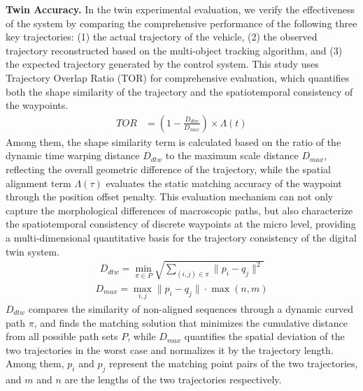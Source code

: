 \documentclass[journal,twoside,web]{ieeecolor}
\begin{document}
\textbf{Twin Accuracy.}
In the twin experimental evaluation, we verify the effectiveness of the system by comparing the comprehensive performance of the following three key trajectories: (1) the actual trajectory of the vehicle, (2) the observed trajectory reconstructed based on the multi-object tracking algorithm, and (3) the expected trajectory generated by the control system.
This study uses Trajectory Overlap Ratio (TOR) for comprehensive evaluation, which quantifies both the shape similarity of the trajectory and the spatiotemporal consistency of the waypoints.
\begin{align}
	TOR & = \left(1 - \frac{D_{dtw}}{D_{max}}\right) \times \Lambda(t)
\end{align}
Among them, the shape similarity term is calculated based on the ratio of the dynamic time warping distance \(D_{dtw}\) to the maximum scale distance \(D_{max}\), reflecting the overall geometric difference of the trajectory, while the spatial alignment term \(\Lambda(\tau)\) evaluates the static matching accuracy of the waypoint through the position offset penalty.
This evaluation mechanism can not only capture the morphological differences of macroscopic paths, but also characterize the spatiotemporal consistency of discrete waypoints at the micro level, providing a multi-dimensional quantitative basis for the trajectory consistency of the digital twin system.
\begin{align}
	D_{dtw} = \min_{\pi \in P} \sqrt{\sum_{(i,j)\in\pi} \|p_i - q_j\|^2}
\end{align}
\begin{align}
	D_{max} = \max_{i,j} \|p_i - q_j\| \cdot \max(n,m)
\end{align}
\(D_{dtw}\) compares the similarity of non-aligned sequences through a dynamic curved path \(\pi\), and finds the matching solution that minimizes the cumulative distance from all possible path sets \(P\), while \(D_{max}\) quantifies the spatial deviation of the two trajectories in the worst case and normalizes it by the trajectory length. Among them, \(p_{i}\) and \(p_{j}\) represent the matching point pairs of the two trajectories, and \(m\) and \(n\) are the lengths of the two trajectories respectively.
\end{document}
